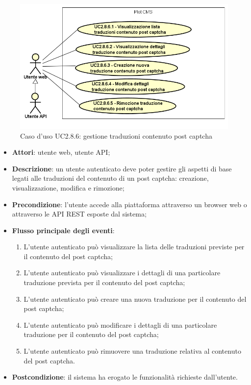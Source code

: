         \begin{figure}[H]
            \centering
            \includegraphics[scale=0.95, width=\textwidth]{immagini/usecase/UC2-8-6.png}
            \caption{Caso d'uso UC2.8.6: gestione traduzioni contenuto post captcha}\label{fig:UC2.8.6} 
        \end{figure}
\begin{itemize}
\item \textbf{Attori}: utente web, utente API;
\item \textbf{Descrizione}: un utente autenticato deve poter gestire gli aspetti di base legati alle traduzioni del contenuto di un post captcha: creazione, visualizzazione, modifica e rimozione; 
      \item \textbf{Precondizione}: l'utente accede alla piattaforma attraverso un browser web o attraverso le API REST esposte dal sistema;

        \item \textbf{Flusso principale degli eventi}:
          \begin{enumerate}
          \item L'utente autenticato può visualizzare la lista delle traduzioni previste per il contenuto del post captcha;
          \item L'utente autenticato può visualizzare i dettagli di una particolare traduzione prevista per il contenuto del post captcha;
          \item L'utente autenticato può creare una nuova traduzione per il contenuto del post captcha;
          \item L'utente autenticato può modificare i dettagli di una particolare traduzione per il contenuto del post captcha;
          \item L'utente autenticato può rimuovere una traduzione relativa al contenuto del post captcha.

      \end{enumerate}
    \item \textbf{Postcondizione}: 	il sistema ha erogato le funzionalità richieste dall'utente.
  \end{itemize}

